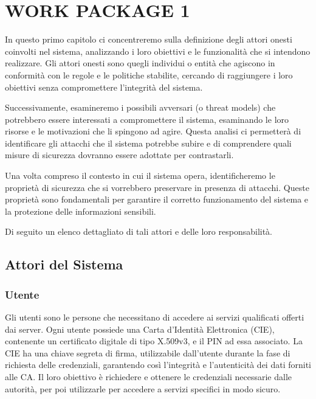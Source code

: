 \chapter{WORK PACKAGE 1}
    In questo primo capitolo ci concentreremo sulla definizione degli attori onesti coinvolti nel sistema, analizzando i loro obiettivi e le funzionalità che si intendono realizzare.
    Gli attori onesti sono quegli individui o entità che agiscono in conformità con le regole e le politiche stabilite, cercando di raggiungere i loro obiettivi senza compromettere l'integrità del sistema.
    
    Successivamente, esamineremo i possibili avversari (o threat models) che potrebbero essere interessati a compromettere il sistema, esaminando le loro risorse e le motivazioni che li spingono ad agire.
    Questa analisi ci permetterà di identificare gli attacchi che il sistema potrebbe subire e di comprendere quali misure di sicurezza dovranno essere adottate per contrastarli.
    
    Una volta compreso il contesto in cui il sistema opera, identificheremo le proprietà di sicurezza che si vorrebbero preservare in presenza di attacchi.
    Queste proprietà sono fondamentali per garantire il corretto funzionamento del sistema e la protezione delle informazioni sensibili.
    
    \noindent Di seguito un elenco dettagliato di tali attori e delle loro responsabilità.

    \section{Attori del Sistema}

        \subsection{Utente}
            Gli utenti sono le persone che necessitano di accedere ai servizi qualificati offerti dai server.
            Ogni utente possiede una Carta d'Identità Elettronica (CIE), contenente un certificato digitale di tipo X.509v3, e il PIN ad essa associato.
            La CIE ha una chiave segreta di firma, utilizzabile dall'utente durante la fase di richiesta delle credenziali, garantendo così l'integrità e l'autenticità dei dati forniti alle CA.
            Il loro obiettivo è richiedere e ottenere le credenziali necessarie dalle autorità, per poi utilizzarle per accedere a servizi specifici in modo sicuro.
        
